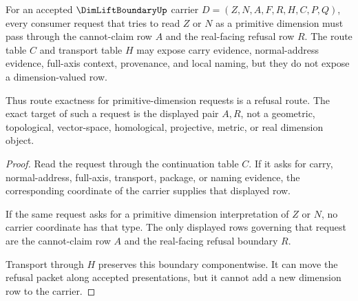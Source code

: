\begin{theorem}
\label{thm:dimliftboundary-cannot-claim-route-exactness}
For an accepted $\DimLiftBoundaryUp$ carrier $D=(Z,N,A,F,R,H,C,P,Q)$, every consumer request that tries to read $Z$ or $N$ as a primitive dimension must pass through the cannot-claim row $A$ and the real-facing refusal row $R$. The route table $C$ and transport table $H$ may expose carry evidence, normal-address evidence, full-axis context, provenance, and local naming, but they do not expose a dimension-valued row.

Thus route exactness for primitive-dimension requests is a refusal route. The exact target of such a request is the displayed pair $A,R$, not a geometric, topological, vector-space, homological, projective, metric, or real dimension object.
\end{theorem}
\begin{proof}
Read the request through the continuation table $C$. If it asks for carry, normal-address, full-axis, transport, package, or naming evidence, the corresponding coordinate of the carrier supplies that displayed row.

If the same request asks for a primitive dimension interpretation of $Z$ or $N$, no carrier coordinate has that type. The only displayed rows governing that request are the cannot-claim row $A$ and the real-facing refusal boundary $R$.

Transport through $H$ preserves this boundary componentwise. It can move the refusal packet along accepted presentations, but it cannot add a new dimension row to the carrier.
\end{proof}

